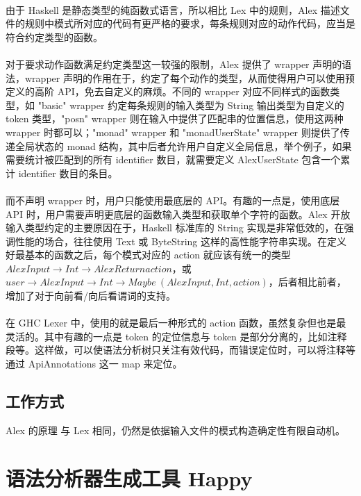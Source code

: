 \documentclass{article}
\begin{document}
	\paragraph{}
	由于 Haskell 是静态类型的纯函数式语言，所以相比 Lex 中的规则，Alex 描述文件的规则中模式所对应的代码有更严格的要求，每条规则对应的动作代码，应当是符合约定类型的函数。
	\paragraph{}
	对于要求动作函数满足约定类型这一较强的限制，Alex 提供了 wrapper 声明的语法，wrapper 声明的作用在于，约定了每个动作的类型，从而使得用户可以使用预定义的高阶 API，免去自定义的麻烦。不同的 wrapper 对应不同样式的函数类型，如 "basic" wrapper 约定每条规则的输入类型为 String 输出类型为自定义的 token 类型，"posn" wrapper 则在输入中提供了匹配串的位置信息，使用这两种 wrapper 时都可以；"monad" wrapper 和 "monadUserState" wrapper 则提供了传递全局状态的 monad 结构，其中后者允许用户自定义全局信息，举个例子，如果需要统计被匹配到的所有 identifier 数目，就需要定义 AlexUserState 包含一个累计 identifier 数目的条目。
	\paragraph{}
	而不声明 wrapper 时，用户只能使用最底层的 API。有趣的一点是，使用底层 API 时，用户需要声明更底层的函数输入类型和获取单个字符的函数。Alex 开放输入类型约定的主要原因在于，Haskell 标准库的 String 实现是非常低效的，在强调性能的场合，往往使用 Text 或 ByteString 这样的高性能字符串实现。在定义好最基本的函数之后，每个模式对应的 action 就应该有统一的类型 $AlexInput \to Int \to AlexReturn action$，或 $user \to AlexInput \to Int \to Maybe\ (AlexInput, Int, action)$，后者相比前者，增加了对于向前看/向后看谓词的支持。
	\paragraph{}
	在 GHC Lexer 中，使用的就是最后一种形式的 action 函数，虽然复杂但也是最灵活的。其中有趣的一点是 token 的定位信息与 token 是部分分离的，比如注释段等。这样做，可以使语法分析树只关注有效代码，而错误定位时，可以将注释等通过 ApiAnnotations 这一 map 来定位。
	\subsection{工作方式}
	Alex 的原理 与 Lex 相同，仍然是依据输入文件的模式构造确定性有限自动机。
	\section{语法分析器生成工具 Happy}
\end{document}
